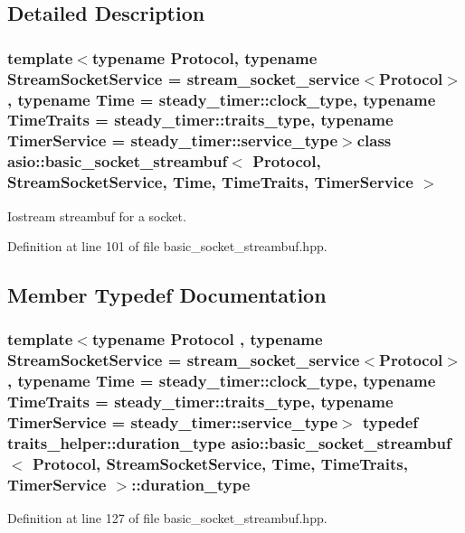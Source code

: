 \subsection{Detailed Description}
\subsubsection*{template$<$typename Protocol, typename Stream\+Socket\+Service = stream\+\_\+socket\+\_\+service$<$\+Protocol$>$, typename Time = steady\+\_\+timer\+::clock\+\_\+type, typename Time\+Traits = steady\+\_\+timer\+::traits\+\_\+type, typename Timer\+Service = steady\+\_\+timer\+::service\+\_\+type$>$class asio\+::basic\+\_\+socket\+\_\+streambuf$<$ Protocol, Stream\+Socket\+Service, Time, Time\+Traits, Timer\+Service $>$}

Iostream streambuf for a socket. 

Definition at line 101 of file basic\+\_\+socket\+\_\+streambuf.\+hpp.



\subsection{Member Typedef Documentation}
\hypertarget{classasio_1_1basic__socket__streambuf_a9205273677adfb1e713637662efa6e12}{}
\subsubsection[{duration\+\_\+type}]{\setlength{\rightskip}{0pt plus 5cm}template$<$typename Protocol , typename Stream\+Socket\+Service  = stream\+\_\+socket\+\_\+service$<$\+Protocol$>$, typename Time  = steady\+\_\+timer\+::clock\+\_\+type, typename Time\+Traits  = steady\+\_\+timer\+::traits\+\_\+type, typename Timer\+Service  = steady\+\_\+timer\+::service\+\_\+type$>$ typedef {\bf traits\+\_\+helper\+::duration\+\_\+type} {\bf asio\+::basic\+\_\+socket\+\_\+streambuf}$<$ Protocol, Stream\+Socket\+Service, Time, Time\+Traits, Timer\+Service $>$\+::{\bf duration\+\_\+type}}\label{classasio_1_1basic__socket__streambuf_a9205273677adfb1e713637662efa6e12}


Definition at line 127 of file basic\+\_\+socket\+\_\+streambuf.\+hpp.

\hypertarget{classasio_1_1basic__socket__streambuf_a89b46b0c3c210f854b355799821fd5db}{}
